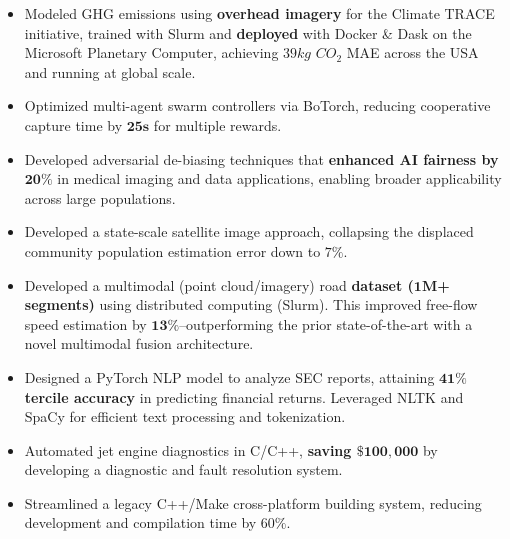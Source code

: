 \documentclass[11pt,a4paper,sans]{moderncv} %
\begin{document}

{
\begin{itemize} 
	\item Modeled GHG emissions using \textbf{overhead imagery} for the Climate TRACE initiative, trained with Slurm and \textbf{deployed} with Docker \& Dask on the Microsoft Planetary Computer, achieving $39kg$ $CO_2$ MAE across the USA and running at global scale.
	\item Optimized multi-agent swarm controllers via BoTorch, reducing cooperative capture time by $\mathbf{25s}$ for multiple rewards.
	\item Developed adversarial de-biasing techniques that \textbf{enhanced AI fairness by $\mathbf{20\%}$} in medical imaging and data applications, enabling broader applicability across large populations.
	\item Developed a state-scale satellite image approach, collapsing the displaced community population estimation error down to $7\%$.
\end{itemize}
}


{
\begin{itemize}
	\item Developed a multimodal (point cloud/imagery) road \textbf{dataset ($\mathbf{1M}$+ segments)} using distributed computing (Slurm). This improved free-flow speed estimation by $\mathbf{13\%}$--outperforming the prior state-of-the-art with a novel multimodal fusion architecture.
	\item Designed a PyTorch NLP model to analyze SEC reports, attaining $\mathbf{41\%}$ \textbf{tercile accuracy} in predicting financial returns. Leveraged NLTK and SpaCy for efficient text processing and tokenization.
\end{itemize}
}


{
\begin{itemize}
	\item Automated jet engine diagnostics in C/C++, \textbf{saving $\mathbf{\$100,000}$} by developing a diagnostic and fault resolution system.
	\item Streamlined a legacy C++/Make cross-platform building system, reducing development and compilation time by $60\%$.
\end{itemize}
}
\end{document}
